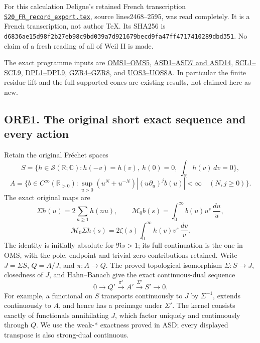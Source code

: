 For this calculation Deligne's retained French transcription
\href{https://www.numdam.org/item/PMIHES_1980__52__137_0/}{\nolinkurl{S20_FR_record_export.tex}},
source lines2468--2595, was read completely. It is a French
transcription, not author TeX. Its SHA256 is
\nolinkurl{d6836ae15d98f2b27eb98c9bd039a7d921679becd9fa47ff4717410289dbd351}. No
claim of a fresh reading of all of Weil II is made.

The exact programme inputs are
\href{ORIGINAL_MELLIN_SPECTRAL_SYNTHESIS.md}{OMS1--OMS5},
\href{ACTUAL_SUPPORTED_DUALITY_INDEPENDENT.md}{ASD1--ASD7 and ASD14},
\href{SPECTRAL_COKERNEL_DIVISIBILITY_AND_FINITE_LIFTING.md}{SCL1--SCL9},
\href{DUALITY_COKERNEL_POLYNOMIAL_LIFTING_INDEPENDENT.md}{DPL1--DPL9},
\href{GLOBAL_ORIGINAL_ZETA_RESIDUE_DUALITY_INDEPENDENT.md}{GZR4--GZR8},
and \href{GLOBAL_UNIT_ORBIT_AND_SUPPORTED_COMPARISON.md}{UOS3--UOS8A}.
In particular the finite residue lift and the full supported cones are
existing results, not claimed here as new.

\subsection{ORE1. The original short exact sequence and every
action}\label{ore1.-the-original-short-exact-sequence-and-every-action}

Retain the original Fréchet spaces \[
S=\{h\in\mathcal S(\mathbb R;\mathbb C):h(-v)=h(v),\
h(0)=0,\ \int_{\mathbb R}h(v)\,dv=0\},
\] \[
A=\{b\in C^\infty(\mathbb R_{>0}):
\sup_{u>0}(u^N+u^{-N})|(u\partial_u)^jb(u)|<\infty
\quad(N,j\ge0)\}.
\tag{ORE1.1}
\] The exact original maps are \[
\Sigma h(u)=2\sum_{n\ge1}h(nu),\qquad
\mathcal M_0b(s)=\int_0^\infty b(u)u^s\,\frac{du}{u},
\] \[
\mathcal M_0\Sigma h(s)=2\zeta(s)
\int_0^\infty h(v)v^s\,\frac{dv}{v}.
\tag{ORE1.2}
\] The identity is initially absolute for \(\Re s>1\); its full
continuation is the one in OMS, with the pole, endpoint and trivial-zero
contributions retained. Write \(J=\Sigma S\), \(Q=A/J\), and
\(\pi:A\to Q\). The proved topological isomorphism \(\Sigma:S\to J\),
closedness of \(J\), and Hahn--Banach give the exact continuous-dual
sequence \[
0\longrightarrow Q'\xrightarrow{\pi'}A'
\xrightarrow{\Sigma'}S'\longrightarrow0.
\tag{ORE1.3}
\] For example, a functional on \(S\) transports continuously to \(J\)
by \(\Sigma^{-1}\), extends continuously to \(A\), and hence has a
preimage under \(\Sigma'\). The kernel consists exactly of functionals
annihilating \(J\), which factor uniquely and continuously through
\(Q\). We use the weak-* exactness proved in ASD; every displayed
transpose is also strong-dual continuous.

